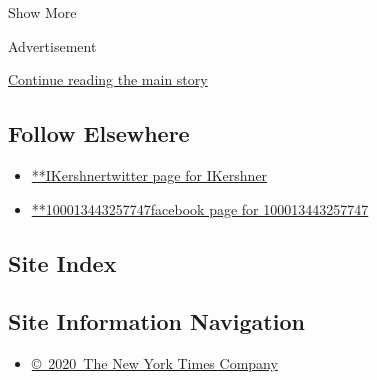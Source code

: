 Show More

Advertisement

\protect\hyperlink{after-mid2}{Continue reading the main story}

\hypertarget{follow-elsewhere}{%
\subsection{Follow Elsewhere}\label{follow-elsewhere}}

\begin{itemize}
\tightlist
\item
  \href{https://twitter.com/IKershner}{**IKershnertwitter page for
  IKershner}
\item
  \href{https://www.facebookcorewwwi.onion/100013443257747}{**100013443257747facebook
  page for 100013443257747}
\end{itemize}

\hypertarget{site-index}{%
\subsection{Site Index}\label{site-index}}

\hypertarget{site-information-navigation}{%
\subsection{Site Information
Navigation}\label{site-information-navigation}}

\begin{itemize}
\tightlist
\item
  \href{https://help.nytimes3xbfgragh.onion/hc/en-us/articles/115014792127-Copyright-notice}{©~2020~The
  New York Times Company}
\end{itemize}

